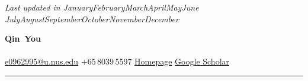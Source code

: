\documentclass[letterpaper,10.5pt]{article}
\begin{document}
\newcommand{\cvMonthYear}{%
  \ifcase\month\or January\or February\or March\or April\or May\or June\or
   July\or August\or September\or October\or November\or December\fi\,\the\year%
}

{\hfill\itshape\color{muted}\footnotesize Last updated in \cvMonthYear\par}
\vspace{-1.4em}

\begin{center}
  {\rmfamily\bfseries\Huge\color{accent} Qin\, You}\\[3pt]
  {\rmfamily\color{muted}\footnotesize{}}\\[5pt]
  {\small\color{ink}%
    \;\href{mailto:e0962995@u.nus.edu}{e0962995@u.nus.edu}%
    \quad{\color{rule}\textbar}\quad
    \;+65\,8039\,5597%
    \quad{\color{rule}\textbar}\quad
    \;\href{https://42xingxing.github.io/}{\color{linkBlue}Homepage}%
    \quad{\color{rule}\textbar}\quad
    \;\href{https://scholar.google.com/citations?user=qC39v8kAAAAJ}{\color{linkBlue}Google Scholar}%
  }
\end{center}

\vspace{2pt}
{\color{rule}\rule{\linewidth}{0.4pt}}
\vspace{-6pt}









\end{document}
